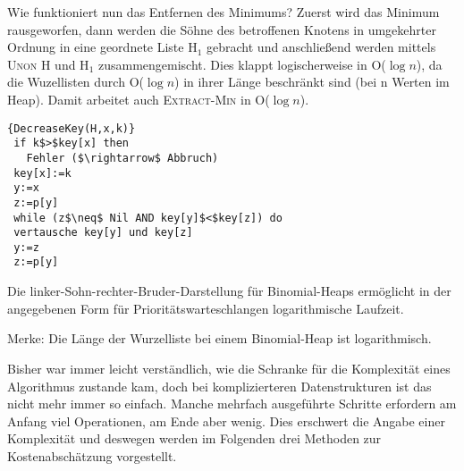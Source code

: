 Wie funktioniert nun das Entfernen des Minimums? Zuerst wird das Minimum rausge\-worfen, dann werden die Söhne des
betroffenen Knotens in umgekehrter Ordnung in eine geordnete Liste H$_1$ gebracht und anschließend werden mittels
\textsc{Unon} H und H$_1$ zusammengemischt. Dies klappt logischerweise in O($\log n$), da die Wuzellisten durch O($\log
n$) in ihrer Länge beschränkt sind (bei n Werten im Heap). Damit arbeitet auch \textsc{Extract-Min} in O($\log n$).

\begin{Algorithmus}[H]
\begin{lstlisting}[frame=tlrb, mathescape=true, title=\textsc{Decrease-Key\textnormal{(H, x, k)}},gobble=1]{DecreaseKey(H,x,k)}
 if k$>$key[x] then
   Fehler ($\rightarrow$ Abbruch)
 key[x]:=k
 y:=x
 z:=p[y]
 while (z$\neq$ Nil AND key[y]$<$key[z]) do
 vertausche key[y] und key[z]
 y:=z
 z:=p[y]    
\end{lstlisting}
\end{Algorithmus}

\begin{satz}
Die linker-Sohn-rechter-Bruder-Darstellung für Binomial-Heaps ermöglicht in der ange\-gebenen Form für
Prioritätswarteschlangen logarithmische Laufzeit.
\end{satz}
Merke: Die Länge der Wurzelliste bei einem Binomial-Heap ist logarithmisch.

Bisher war immer leicht verständlich, wie die Schranke für die Komplexität eines Algorithmus zustande kam, doch bei
komplizierteren Datenstrukturen ist das nicht mehr immer so einfach. Manche mehrfach ausgeführte Schritte erfordern am
Anfang viel Operationen, am Ende aber wenig. Dies erschwert die Angabe einer Komplexität und deswegen werden im Folgenden drei Methoden zur
Kostenabschätzung vorgestellt.

